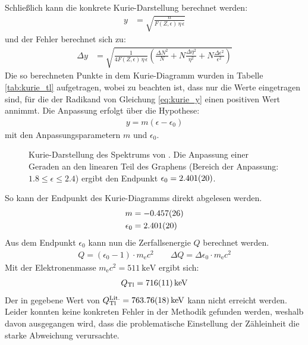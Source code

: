 \documentclass[11pt, a4paper]{article}
\numberwithin{equation}{section}
\begin{document}
Schließlich kann die konkrete Kurie-Darstellung berechnet werden:
\begin{align}
	y &= \sqrt{\frac{n}{F(Z,\epsilon) \, \eta \, \epsilon}}
	\label{eq:kurie_y}
\end{align}
und der Fehler berechnet sich zu:
\begin{align}
	\Delta y &= 
	\sqrt{\frac{1}{4 F(Z, \epsilon) \, \eta \, \epsilon}
	\left( \frac{\Delta N^2}{N} + N \frac{\Delta \eta^2}{\eta^2} + N \frac{\Delta \epsilon^2}{\epsilon^2} \right)
	}
\end{align}
Die so berechneten Punkte in dem Kurie-Diagramm wurden in Tabelle \ref{tab:kurie_tl} aufgetragen, wobei zu beachten ist, dass nur die Werte eingetragen sind, für die der Radikand von Gleichung \eqref{eq:kurie_y} einen positiven Wert annimmt.
Die Anpassung erfolgt über die Hypothese:
\begin{align}
	y = m (\epsilon - \epsilon_0)
\end{align}
mit den Anpassungsparametern $m$ und $\epsilon_0$.
\begin{figure}[h]
	\centering
	
	\caption{Kurie-Darstellung des Spektrums von . Die Anpassung einer Geraden an den linearen Teil des Graphens (Bereich der Anpassung: $\num{1.8} \leq \epsilon \leq {2.4}$) ergibt den Endpunkt $\epsilon_0 = \num{2.401 +- 0.020}$.}
	\label{fig:thallium_kurie}
\end{figure}
So kann der Endpunkt des Kurie-Diagramms direkt abgelesen werden.
\begin{align*}
	m &= \num{-0.457 +- 0.026} \\
	\epsilon_0 &= \num{2.401 +- 0.020}
\end{align*}
Aus dem Endpunkt $\epsilon_0$ kann nun die Zerfallsenergie $Q$ berechnet werden.
\begin{align}
	Q = (\epsilon_0 - 1) \cdot m_\mathrm{e} c^2 \qquad
	\Delta Q = \Delta \epsilon_0 \cdot m_\mathrm{e} c^2
	\label{eq:zerfallsenergie}
\end{align}
Mit der Elektronenmasse $m_\mathrm{e} c^2 = \SI{511}{\kilo\electronvolt}$ ergibt sich:
\begin{align*}
	Q_\mathrm{Tl} = \SI{716 +- 11}{\kilo\electronvolt}
\end{align*}
Der in \cite{tl_literatur} gegebene Wert von $Q_\mathrm{Tl}^\mathrm{Lit.} = \SI{763.76 +- 0.18}{\kilo\electronvolt}$ kann nicht erreicht werden.
Leider konnten keine konkreten Fehler in der Methodik gefunden werden, weshalb davon ausgegangen wird, dass die problematische Einstellung der Zähleinheit die starke Abweichung verursachte.
\FloatBarrier
\newpage
\end{document}
